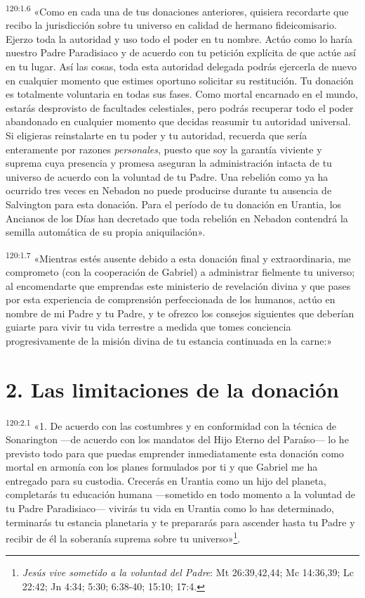 \par 
\textsuperscript{120:1.6} «Como en cada una de tus donaciones anteriores, quisiera recordarte que recibo la jurisdicción sobre tu universo en calidad de hermano fideicomisario. Ejerzo toda la autoridad y uso todo el poder en tu nombre. Actúo como lo haría nuestro Padre Paradisiaco y de acuerdo con tu petición explícita de que actúe así en tu lugar. Así las cosas, toda esta autoridad delegada podrás ejercerla de nuevo en cualquier momento que estimes oportuno solicitar su restitución. Tu donación es totalmente voluntaria en todas sus fases. Como mortal encarnado en el mundo, estarás desprovisto de facultades celestiales, pero podrás recuperar todo el poder abandonado en cualquier momento que decidas reasumir tu autoridad universal. Si eligieras reinstalarte en tu poder y tu autoridad, recuerda que sería enteramente por razones \textit{personales}, puesto que soy la garantía viviente y suprema cuya presencia y promesa aseguran la administración intacta de tu universo de acuerdo con la voluntad de tu Padre. Una rebelión como ya ha ocurrido tres veces en Nebadon no puede producirse durante tu ausencia de Salvington para esta donación. Para el período de tu donación en Urantia, los Ancianos de los Días han decretado que toda rebelión en Nebadon contendrá la semilla automática de su propia aniquilación».

\par 
\textsuperscript{120:1.7} «Mientras estés ausente debido a esta donación final y extraordinaria, me comprometo (con la cooperación de Gabriel) a administrar fielmente tu universo; al encomendarte que emprendas este ministerio de revelación divina y que pases por esta experiencia de comprensión perfeccionada de los humanos, actúo en nombre de mi Padre y tu Padre, y te ofrezco los consejos siguientes que deberían guiarte para vivir tu vida terrestre a medida que tomes conciencia progresivamente de la misión divina de tu estancia continuada en la carne:»

\section*{2. Las limitaciones de la donación}
\par 
\textsuperscript{120:2.1} «1. De acuerdo con las costumbres y en conformidad con la técnica de Sonarington ---de acuerdo con los mandatos del Hijo Eterno del Paraíso--- lo he previsto todo para que puedas emprender inmediatamente esta donación como mortal en armonía con los planes formulados por ti y que Gabriel me ha entregado para su custodia. Crecerás en Urantia como un hijo del planeta, completarás tu educación humana ---sometido en todo momento a la voluntad de tu Padre Paradisiaco--- vivirás tu vida en Urantia como lo has determinado, terminarás tu estancia planetaria y te prepararás para ascender hasta tu Padre y recibir de él la soberanía suprema sobre tu universo»\footnote{\textit{Jesús vive sometido a la voluntad del Padre}: Mt 26:39,42,44; Mc 14:36,39; Lc 22:42; Jn 4:34; 5:30; 6:38-40; 15:10; 17:4.}.

